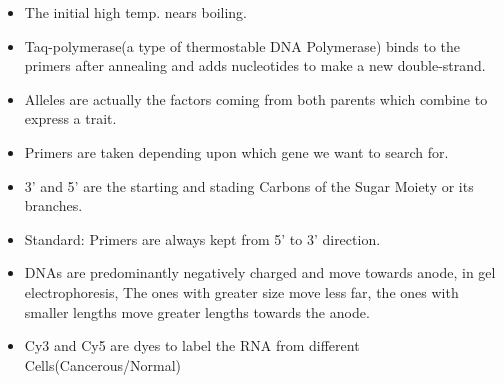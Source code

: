 \documentclass{article}
\begin{document}
\begin{itemize}
  \item The initial high temp. nears boiling.
  \item Taq-polymerase(a type of thermostable DNA Polymerase) binds to the primers after annealing and adds nucleotides to make a new double-strand.
  \item Alleles are actually the factors coming from both parents which combine to express a trait.
  \item Primers are taken depending upon which gene we want to search for.
  \item 3' and 5' are the starting and stading Carbons of the Sugar Moiety or its branches.
  \item Standard: Primers are always kept from 5' to 3' direction.
  \item DNAs are predominantly negatively charged and move towards anode, in gel electrophoresis, The ones with greater size move less far, the ones with smaller lengths move greater lengths towards the anode.
  \item Cy3 and Cy5 are dyes to label the RNA from different Cells(Cancerous/Normal)
\end{itemize}
\end{document}
